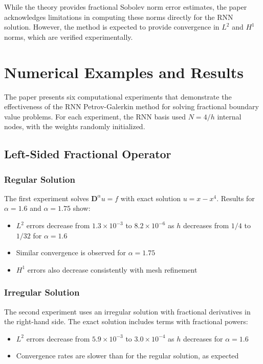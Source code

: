 \documentclass[11pt]{article}
\begin{document}
While the theory provides fractional Sobolev norm error estimates, the paper acknowledges limitations in computing these norms directly for the RNN solution. However, the method is expected to provide convergence in $L^2$ and $H^1$ norms, which are verified experimentally.

\section{Numerical Examples and Results}

The paper presents six computational experiments that demonstrate the effectiveness of the RNN Petrov-Galerkin method for solving fractional boundary value problems. For each experiment, the RNN basis used $N = 4/h$ internal nodes, with the weights randomly initialized.

\subsection{Left-Sided Fractional Operator}

\subsubsection{Regular Solution}
The first experiment solves $\mathbf{D}^\alpha u = f$ with exact solution $u = x - x^4$. Results for $\alpha = 1.6$ and $\alpha = 1.75$ show:
\begin{itemize}
    \item $L^2$ errors decrease from $1.3 \times 10^{-3}$ to $8.2 \times 10^{-6}$ as $h$ decreases from $1/4$ to $1/32$ for $\alpha = 1.6$
    \item Similar convergence is observed for $\alpha = 1.75$
    \item $H^1$ errors also decrease consistently with mesh refinement
\end{itemize}

\subsubsection{Irregular Solution}
The second experiment uses an irregular solution with fractional derivatives in the right-hand side. The exact solution includes terms with fractional powers:
\begin{itemize}
    \item $L^2$ errors decrease from $5.9 \times 10^{-3}$ to $3.0 \times 10^{-4}$ as $h$ decreases for $\alpha = 1.6$
    \item Convergence rates are slower than for the regular solution, as expected
\end{itemize}
\end{document}
